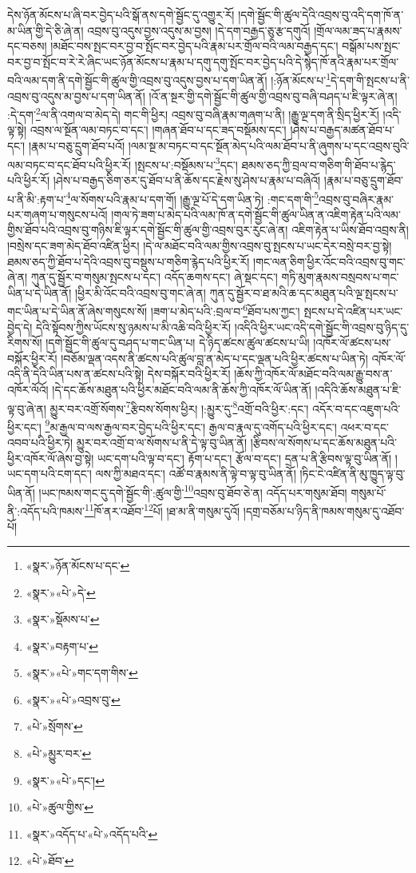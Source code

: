 དེས་ཉོན་མོངས་པ་ཞི་བར་བྱེད་པའི་སྒོ་ནས་དགེ་སྦྱོང་དུ་འགྱུར་རོ། །དགེ་སྦྱོང་གི་ཚུལ་དེའི་འབྲས་བུ་འདི་དག་ཁོ་ན་མ་ཡིན་གྱི་དེ་ཅི་ཞེ་ན། འབྲས་བུ་འདུས་བྱས་འདུས་མ་བྱས། །དེ་དག་བརྒྱད་ཅུ་རྩ་དགུའོ། །གྲོལ་ལམ་ཟད་པ་རྣམས་དང་བཅས། །མཐོང་བས་སྤང་བར་བྱ་བ་སྤོང་བར་བྱེད་པའི་རྣམ་པར་གྲོལ་བའི་ལམ་བརྒྱད་དང་། བསྒོམ་པས་སྤང་བར་བྱ་བ་སྤོང་བ་རེ་རེ་ཞིང་ཡང་ཉོན་མོངས་པ་རྣམ་པ་དགུ་དགུ་སྤོང་བར་བྱེད་པའི་དེ་སྙེད་ཁོ་ནའི་རྣམ་པར་གྲོལ་བའི་ལམ་དག་ནི་དགེ་སྦྱོང་གི་ཚུལ་གྱི་འབྲས་བུ་འདུས་བྱས་པ་དག་ཡིན་ནོ། །:ཉོན་མོངས་པ་\footnote{«སྣར་»ཉོན་མོངས་པ་དང་}དེ་དག་གི་སྤངས་པ་ནི་འབྲས་བུ་འདུས་མ་བྱས་པ་དག་ཡིན་ནོ། །འོ་ན་སྔར་གྱི་དགེ་སྦྱོང་གི་ཚུལ་གྱི་འབྲས་བུ་བཞི་བཤད་པ་ཇི་ལྟར་ཞེ་ན། :དེ་དག་\footnote{«སྣར་»«པེ་»དེ་}ལ་ནི་འགལ་བ་མེད་དེ། གང་གི་ཕྱིར། འབྲས་བུ་བཞི་རྣམ་གཞག་པ་ནི། །རྒྱུ་ལྔ་དག་ནི་སྲིད་ཕྱིར་རོ། །འདི་ལྟ་སྟེ། འབྲས་ལ་སྔོན་ལམ་བཏང་བ་དང་། །གཞན་ཐོབ་པ་དང་ཟད་བསྡོམས་དང་། །ཤེས་པ་བརྒྱད་མཚན་ཐོབ་པ་དང་། །རྣམ་པ་བཅུ་དྲུག་ཐོབ་པའོ། །ལམ་སྔ་མ་བཏང་བ་དང་སྔོན་མེད་པའི་ལམ་ཐོབ་པ་ནི་ཞུགས་པ་དང་འབྲས་བུའི་ལམ་བཏང་བ་དང་ཐོབ་པའི་ཕྱིར་རོ། །སྤངས་པ་:བསྡོམས་པ་\footnote{«སྣར་»སྡོམས་པ་}དང་། ཐམས་ཅད་ཀྱི་བྲལ་བ་གཅིག་གི་ཐོབ་པ་རྙེད་པའི་ཕྱིར་རོ། །ཤེས་པ་བརྒྱད་ཅིག་ཅར་དུ་ཐོབ་པ་ནི་ཆོས་དང་རྗེས་སུ་ཤེས་པ་རྣམ་པ་བཞིའོ། །རྣམ་པ་བཅུ་དྲུག་ཐོབ་པ་ནི་མི་:རྟག་པ་\footnote{«སྣར་»བརྟག་པ་}ལ་སོགས་པའི་རྣམ་པ་དག་གོ། །རྒྱུ་ལྔ་པོ་དེ་དག་ཡིན་ཏེ། :གང་དག་གི་\footnote{«སྣར་»«པེ་»གང་དག་གིས་}འབྲས་བུ་བཞིར་རྣམ་པར་གཞག་པ་གསུངས་པའོ། །གལ་ཏེ་ཟག་པ་མེད་པའི་ལམ་ཁོ་ན་དགེ་སྦྱོང་གི་ཚུལ་ཡིན་ན་འཇིག་རྟེན་པའི་ལམ་གྱིས་ཐོབ་པའི་འབྲས་བུ་གཉིས་ཇི་ལྟར་དགེ་སྦྱོང་གི་ཚུལ་གྱི་འབྲས་བུར་རུང་ཞེ་ན། འཇིག་རྟེན་པ་ཡིས་ཐོབ་འབྲས་ནི། །བསྲེས་དང་ཟག་མེད་ཐོབ་འཛིན་ཕྱིར། །དེ་ལ་མཐོང་བའི་ལམ་གྱིས་འབྲས་བུ་སྤངས་པ་ཡང་དེར་བསྲེ་བར་བྱ་སྟེ། ཐམས་ཅད་ཀྱི་ཐོབ་པ་དེའི་འབྲས་བུ་བསྡུས་པ་གཅིག་རྙེད་པའི་ཕྱིར་རོ། །གང་ལན་ཅིག་ཕྱིར་འོང་བའི་འབྲས་བུ་གང་ཞེ་ན། ཀུན་དུ་སྦྱོར་བ་གསུམ་སྤངས་པ་དང་། འདོད་ཆགས་དང་། ཞེ་སྡང་དང་། གཏི་མུག་རྣམས་བསྲབས་པ་གང་ཡིན་པ་དེ་ཡིན་ནོ། །ཕྱིར་མི་འོང་བའི་འབྲས་བུ་གང་ཞེ་ན། ཀུན་དུ་སྦྱོར་བ་ཐ་མའི་ཆ་དང་མཐུན་པའི་ལྔ་སྤངས་པ་གང་ཡིན་པ་དེ་ཡིན་ནོ་ཞེས་གསུངས་སོ། །ཟག་པ་མེད་པའི་:བྲལ་བ་\footnote{«སྣར་»«པེ་»འབྲས་བུ་}ཐོབ་པས་ཀྱང་། སྤངས་པ་དེ་འཛིན་པར་ཡང་བྱེད་དེ། དེའི་སྟོབས་ཀྱིས་ཡོངས་སུ་ཉམས་པ་མི་འཆི་བའི་ཕྱིར་རོ། །འདིའི་ཕྱིར་ཡང་འདི་དགེ་སྦྱོང་གི་འབྲས་བུ་ཉིད་དུ་རིགས་སོ། །དགེ་སྦྱོང་གི་ཚུལ་དུ་བཤད་པ་གང་ཡིན་པ། དེ་ཉིད་ཚངས་ཚུལ་ཚངས་པ་ཡི། །འཁོར་ལོ་ཚངས་པས་བསྐོར་ཕྱིར་རོ། །བཅོམ་ལྡན་འདས་ནི་ཚངས་པའི་ཚུལ་བླ་ན་མེད་པ་དང་ལྡན་པའི་ཕྱིར་ཚངས་པ་ཡིན་ཏེ། འཁོར་ལོ་འདི་ནི་དེའི་ཡིན་པས་ན་ཚངས་པའི་སྟེ། དེས་བསྐོར་བའི་ཕྱིར་རོ། །ཆོས་ཀྱི་འཁོར་ལོ་མཐོང་བའི་ལམ་རྒྱུ་བས་ན་འཁོར་ལོའོ། །དེ་དང་ཆོས་མཐུན་པའི་ཕྱིར་མཐོང་བའི་ལམ་ནི་ཆོས་ཀྱི་འཁོར་ལོ་ཡིན་ནོ། །འདིའི་ཆོས་མཐུན་པ་ཇི་ལྟ་བུ་ཞེ་ན། མྱུར་བར་འགྲོ་སོགས་\footnote{«པེ་»སྲོགས་}རྩིབས་སོགས་ཕྱིར། །:མྱུར་དུ་\footnote{«པེ་»མྱུར་བར་}འགྲོ་བའི་ཕྱིར་:དང་། འདོར་བ་དང་འཇུག་པའི་ཕྱིར་དང་། \footnote{«སྣར་»«པེ་»དང་།  }མ་རྒྱལ་བ་ལས་རྒྱལ་བར་བྱེད་པའི་ཕྱིར་དང་། རྒྱལ་བ་རྣལ་དུ་འགོད་པའི་ཕྱིར་དང་། འཕར་བ་དང་འབབ་པའི་ཕྱིར་ཏེ། མྱུར་བར་འགྲོ་བ་ལ་སོགས་པ་ནི་དེ་ལྟ་བུ་ཡིན་ནོ། །རྩིབས་ལ་སོགས་པ་དང་ཆོས་མཐུན་པའི་ཕྱིར་འཁོར་ལོ་ཞེས་བྱ་སྟེ། ཡང་དག་པའི་ལྟ་བ་དང་། རྟོག་པ་དང་། རྩོལ་བ་དང་། དྲན་པ་ནི་རྩིབས་ལྟ་བུ་ཡིན་ནོ། །ཡང་དག་པའི་ངག་དང་། ལས་ཀྱི་མཐའ་དང་། འཚོ་བ་རྣམས་ནི་ལྟེ་བ་ལྟ་བུ་ཡིན་ནོ། །ཏིང་ངེ་འཛིན་ནི་མུ་ཁྱུད་ལྟ་བུ་ཡིན་ནོ། །ཡང་ཁམས་གང་དུ་དགེ་སྦྱོང་གི་:ཚུལ་གྱི་\footnote{«པེ་»ཚུལ་གྱིས་}འབྲས་བུ་ཐོབ་ཅེ་ན། འདོད་པར་གསུམ་ཐོབ། གསུམ་པོ་ནི་:འདོད་པའི་ཁམས་\footnote{«སྣར་»འདོད་པ་«པེ་»འདོད་པའི་}ཁོ་ནར་འཐོབ་\footnote{«པེ་»ཐོབ་}པོ། །ཐ་མ་ནི་གསུམ་དུའོ། །དགྲ་བཅོམ་པ་ཉིད་ནི་ཁམས་གསུམ་དུ་འཐོབ་པོ། 